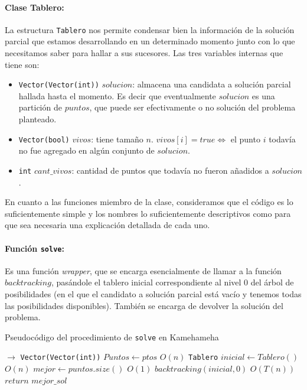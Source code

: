  \paragraph{Clase Tablero:} La estructura \texttt{Tablero} nos permite condensar bien la información de la solución parcial que estamos desarrollando en un determinado momento junto con lo que necesitamos saber para hallar a sus sucesores. Las tres variables internas que tiene son:
  \begin{itemize}
    \item \texttt{Vector(Vector(int))} $solucion$: almacena una candidata a solución parcial hallada hasta el momento. Es decir que eventualmente $solucion$ es una partición de $puntos$, que puede ser efectivamente o no solución del problema planteado.
    \item \texttt{Vector(bool)} $vivos$: tiene tamaño $n$. $vivos[i] = true \Leftrightarrow$ el punto $i$ todavía no fue agregado en algún conjunto de $solucion$.
    \item \texttt{int} $cant\_vivos$: cantidad de puntos que todavía no fueron añadidos a $solucion$.
  \end{itemize}

  En cuanto a las funciones miembro de la clase, consideramos que el código es lo suficientemente simple y los nombres lo suficientemente descriptivos como para que sea necesaria una explicación detallada de cada uno.

  \paragraph{Función \texttt{solve}:} Es una función \textit{wrapper}, que se encarga esencialmente de llamar a la función $backtracking$, pasándole el tablero inicial correspondiente al nivel 0 del árbol de posibilidades (en el  que el candidato a solución parcial está vacío y tenemos todas las posibilidades disponibles). También se encarga de devolver la solución del problema.

  \begin{algorithm}[H]
  \begin{algorithmic}
  \caption{Pseudocódigo del procedimiento de \texttt{solve} en Kamehameha}
    $\rightarrow$ \texttt{Vector(Vector(int))}
      \State $Puntos\gets ptos$
      \Comment $O(n)$
      \State \texttt{Tablero} $inicial \gets Tablero()$
      \Comment $O(n)$
      \State $mejor \gets puntos.size()$
      \Comment $O(1)$
      \State $backtracking(inicial,0)$
      \Comment $O(T(n))$
      \State $return$ $mejor\_sol$
    \EndProcedure
  \end{algorithmic}
  \end{algorithm}

